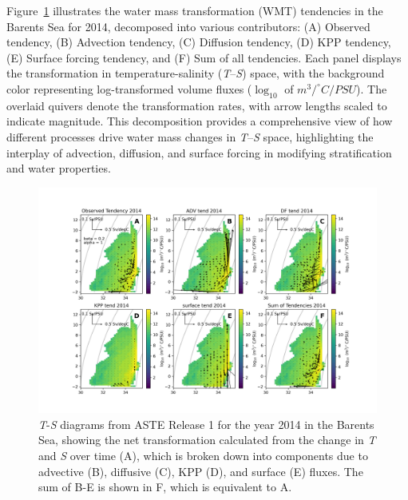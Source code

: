 \documentclass[draft]{agujournal2019}
\begin{document}

Figure~\ref{fig:sample_wmt} illustrates the water mass transformation (WMT) tendencies in the Barents Sea for 2014, decomposed into various contributors: (A) Observed tendency, (B) Advection tendency, (C) Diffusion tendency, (D) KPP tendency, (E) Surface forcing tendency, and (F) Sum of all tendencies. Each panel displays the transformation in temperature-salinity (\emph{T}--\emph{S}) space, with the background color representing log-transformed volume fluxes ($\log_10$ of $m^3/^\circ C/PSU$). The overlaid quivers denote the transformation rates, with arrow lengths scaled to indicate magnitude. This decomposition provides a comprehensive view of how different processes drive water mass changes in \emph{T}--\emph{S} space, highlighting the interplay of advection, diffusion, and surface forcing in modifying stratification and water properties.

    \begin{figure} %
    \centering
    \includegraphics[width=\linewidth]{figs/BarentsS_alltend_2014.png}
    \caption{\emph{T}-\emph{S} diagrams from ASTE Release 1 for the year 2014 in the Barents Sea, showing the net transformation calculated from the change in \emph{T} and \emph{S} over time (A), which is broken down into components due to advective (B), diffusive (C), KPP (D), and surface (E) fluxes. The sum of B-E is shown in F, which is equivalent to A.}
    \label{fig:sample_wmt}
    \end{figure}
\end{document}
